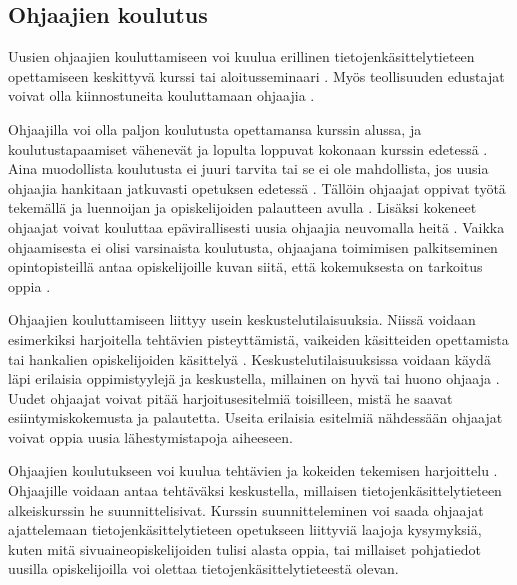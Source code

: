\documentclass[finnish]{tktltiki2}
\theoremstyle{definition}
\theoremstyle{remark}
\begin{document}
\subsection{Ohjaajien koulutus}

Uusien ohjaajien kouluttamiseen voi kuulua erillinen tietojenkäsittelytieteen opettamiseen keskittyvä kurssi \cite{Reges88, Roberts95} tai aloitusseminaari \cite{Sperry08}. Myös teollisuuden edustajat voivat olla kiinnostuneita kouluttamaan ohjaajia \cite{Morgan02}. \par

Ohjaajilla voi olla paljon koulutusta opettamansa kurssin alussa, ja koulutustapaamiset vähenevät ja lopulta loppuvat kokonaan kurssin edetessä \cite{Roberts95}. Aina muodollista koulutusta ei juuri tarvita tai se ei ole mahdollista, jos uusia ohjaajia hankitaan jatkuvasti opetuksen edetessä \cite{Kurhila11}. Tällöin ohjaajat oppivat työtä tekemällä ja luennoijan ja opiskelijoiden palautteen avulla \cite{Shannon98, Vihavainen}. Lisäksi kokeneet ohjaajat voivat kouluttaa epävirallisesti uusia ohjaajia neuvomalla heitä \cite{Kurhila11}. Vaikka ohjaamisesta ei olisi varsinaista koulutusta, ohjaajana toimimisen palkitseminen opintopisteillä antaa opiskelijoille kuvan siitä, että kokemuksesta on tarkoitus oppia \cite{Vikberg}. \par

Ohjaajien kouluttamiseen liittyy usein keskustelutilaisuuksia. Niissä voidaan esimerkiksi harjoitella tehtävien pisteyttämistä, vaikeiden käsitteiden opettamista tai hankalien opiskelijoiden käsittelyä \cite{Reges03}. Kes\-kus\-te\-lu\-ti\-lai\-suuk\-sis\-sa voidaan käydä läpi erilaisia oppimistyylejä ja keskustella, millainen on hyvä tai huono ohjaaja \cite{Kay95}. Uudet ohjaajat voivat pitää harjoitusesitelmiä toisilleen, mistä he saavat esiintymiskokemusta ja palautetta. Useita erilaisia esitelmiä nähdessään ohjaajat voivat oppia uusia lähestymistapoja aiheeseen.  \par

Ohjaajien koulutukseen voi kuulua tehtävien ja kokeiden tekemisen harjoittelu \cite{Kay95}. Ohjaajille voidaan antaa tehtäväksi keskustella, millaisen tie\-to\-jen\-kä\-sit\-te\-ly\-tie\-teen alkeiskurssin he suunnittelisivat. Kurssin suunnitteleminen voi saada ohjaajat ajattelemaan tie\-to\-jen\-kä\-sit\-te\-ly\-tie\-teen opetukseen liittyviä laajoja kysymyksiä, kuten mitä sivuaineopiskelijoiden tulisi alasta oppia, tai millaiset pohjatiedot uusilla opiskelijoilla voi olettaa tietojenkäsittelytieteestä olevan.  \par
\end{document}
